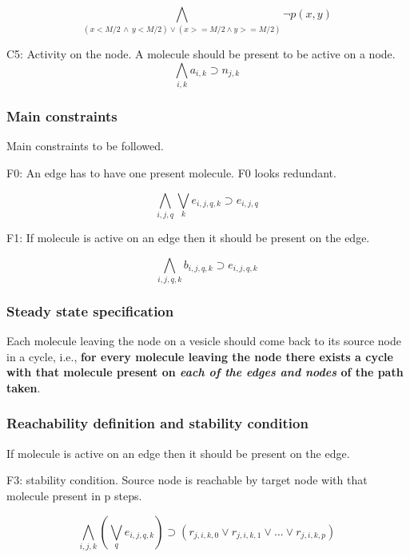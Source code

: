 \[ \bigwedge\limits_{(x < M/2 \, \land  \, y < M/2) \lor  (x >= M/2 \land y >= M/2)} \neg p(x,y) \, \]

C5: Activity on the node. A molecule should be present to be active on a node.  
\[ \bigwedge\limits_{i,k} a_{i,k} \supset n_{j,k} \, \]  




\subsubsection{Main constraints}
Main constraints to be followed. \newline

F0:  An edge has to have one present molecule. F0 looks redundant.

\[ \bigwedge\limits_{i,j,q} \bigvee_k e_{i,j,q,k} \supset e_{i,j,q} \, \]  

F1: If molecule is active on an edge then it should be present on the edge.

\[ \bigwedge\limits_{i,j,q,k} b_{i,j,q,k} \supset e_{i,j,q,k}\, \]


\subsubsection{Steady state specification}
Each molecule leaving the node on a vesicle should come back to its source node in a cycle, i.e., \textbf{for every molecule leaving the node there exists a cycle with that molecule present on \textit{each of the edges and nodes} of the path taken}.

\subsubsection{Reachability definition and stability condition}
If molecule is active on an edge then it should be present on the edge. \newline


F3: stability condition. Source node is reachable by target node with that molecule present in p steps.


\[ \bigwedge\limits_{i,j,k} (\bigvee_{q} e_{i,j,q,k}) \supset (r_{j,i,k,0}  \lor r_{j,i,k,1} \lor ... \lor r_{j,i,k,p}) \, \]

